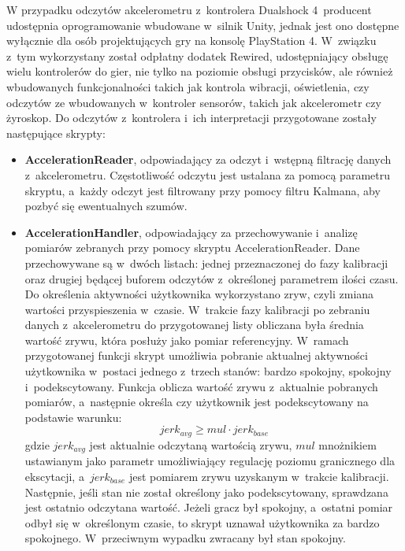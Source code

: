 W przypadku odczytów akcelerometru z~kontrolera Dualshock 4~producent udostępnia oprogramowanie wbudowane w~silnik Unity, jednak jest ono dostępne wyłącznie dla osób projektujących gry na konsolę PlayStation 4. W~związku z~tym wykorzystany został odpłatny dodatek Rewired, udostępniający obsługę wielu kontrolerów do gier, nie tylko na poziomie obsługi przycisków, ale również wbudowanych funkcjonalności takich jak kontrola wibracji, oświetlenia, czy odczytów ze wbudowanych w~kontroler sensorów, takich jak akcelerometr czy żyroskop. Do odczytów z~kontrolera i~ich interpretacji przygotowane zostały następujące skrypty:
\begin{itemize}
	\item \textbf{AccelerationReader}, odpowiadający za odczyt i~wstępną filtrację danych z~akcelerometru. Częstotliwość odczytu jest ustalana za pomocą parametru skryptu, a~każdy odczyt jest filtrowany przy pomocy filtru Kalmana, aby pozbyć się ewentualnych szumów.
	\item \textbf{AccelerationHandler}, odpowiadający za przechowywanie i~analizę pomiarów zebranych przy pomocy skryptu AccelerationReader. Dane przechowywane są w~dwóch listach: jednej przeznaczonej do fazy kalibracji oraz drugiej będącej buforem odczytów z~określonej parametrem ilości czasu. Do określenia aktywności użytkownika wykorzystano zryw, czyli zmiana wartości przyspieszenia w~czasie. W~trakcie fazy kalibracji po zebraniu danych z~akcelerometru do przygotowanej listy obliczana była średnia wartość zrywu, która posłuży jako pomiar referencyjny. W~ramach przygotowanej funkcji skrypt umożliwia pobranie aktualnej aktywności użytkownika w~postaci jednego z~trzech stanów: bardzo spokojny, spokojny i~podekscytowany. Funkcja oblicza wartość zrywu z~aktualnie pobranych pomiarów, a~następnie określa czy użytkownik jest podekscytowany na podstawie warunku:
	$$
	jerk_{avg} \geq mul \cdot jerk_{base}
	$$
	gdzie $jerk_{avg}$ jest aktualnie odczytaną wartością zrywu, $mul$ mnożnikiem ustawianym jako parametr umożliwiający regulację poziomu granicznego dla ekscytacji, a~$jerk_{base}$ jest pomiarem zrywu uzyskanym w~trakcie kalibracji. Następnie, jeśli stan nie został określony jako podekscytowany, sprawdzana jest ostatnio odczytana wartość. Jeżeli gracz był spokojny, a~ostatni pomiar odbył się w~określonym czasie, to skrypt uznawał użytkownika za bardzo spokojnego. W~przeciwnym wypadku zwracany był stan spokojny.
\end{itemize}

